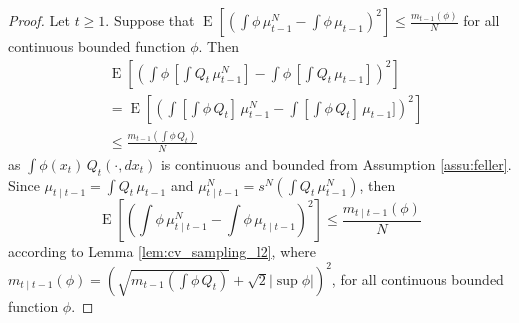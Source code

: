 \documentclass{article}
\DeclareMathOperator{\E}{E}
\begin{document}
\begin{proof}
    Let $t \geq 1$. Suppose that $\displaystyle \E[(\int \phi \, \mu^N_{t-1} - \int \phi \, \mu_{t-1})^2] \leq \frac{m_{t-1}(\phi)}{N}$ for all continuous bounded function $\phi$. Then
    \begin{align*}
        & \E[(\int \phi \, [\int Q_t \, \mu^N_{t-1}] - \int \phi \, [\int Q_t \, \mu_{t-1}])^2] \\
        & = \E[(\int [\int \phi \, Q_t] \, \mu^N_{t-1} - \int [\int \phi \, Q_t ] \, \mu_{t-1}])^2] \\
        & \leq \frac{m_{t-1}(\int \phi \, Q_t)}{N}
    \end{align*}
    as $\displaystyle \int \phi(x_t) \, Q_t(\cdot,dx_t)$ is continuous and bounded from Assumption \ref{assu:feller}. Since $\displaystyle \mu_{t \mid t-1} = \int Q_t \, \mu_{t-1}$ and $\displaystyle \mu^N_{t \mid t-1} = s^N(\int Q_t \, \mu^N_{t-1})$, then
    \begin{equation}
    \label{eq:bound_pred_l2}
        \E[(\int \phi \, \mu^N_{t \mid t-1} - \int \phi \, \mu_{t \mid t-1})^2] \leq \frac{m_{t \mid t-1}(\phi)}{N}
    \end{equation}
    according to Lemma \ref{lem:cv_sampling_l2}, where $\displaystyle m_{t \mid t-1}(\phi) = (\sqrt{m_{t-1}(\int \phi \, Q_t)} + \sqrt 2 |\sup \phi|)^2$, for all continuous bounded function $\phi$.
  

\end{proof}
\end{document}
